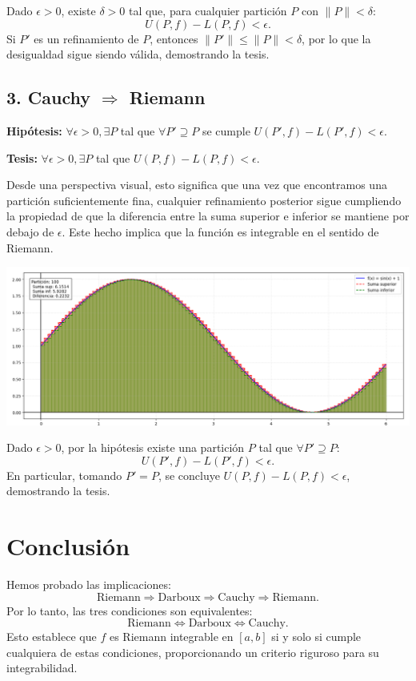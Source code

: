 \documentclass{article}
\begin{document}
Dado $\epsilon > 0$, existe $\delta > 0$ tal que, para cualquier partición $P$ con $\lVert P \rVert < \delta$:
\[
U(P, f) - L(P, f) < \epsilon.
\]
Si $P'$ es un refinamiento de $P$, entonces $\lVert P' \rVert \leq \lVert P \rVert < \delta$, por lo que la desigualdad sigue siendo válida, demostrando la tesis.

\subsection*{3. Cauchy $\Rightarrow$ Riemann}
\textbf{Hipótesis:} $\forall \epsilon > 0, \exists P$ tal que $\forall P' \supseteq P$ se cumple $U(P', f) - L(P', f) < \epsilon$.

\textbf{Tesis:} $\forall \epsilon > 0, \exists P$ tal que $U(P, f) - L(P, f) < \epsilon$.

Desde una perspectiva visual, esto significa que una vez que encontramos una partición suficientemente fina, cualquier refinamiento posterior sigue cumpliendo la propiedad de que la diferencia entre la suma superior e inferior se mantiene por debajo de $\epsilon$. Este hecho implica que la función es integrable en el sentido de Riemann.

\begin{center}
    \includegraphics[width=1\textwidth]{Figure_3.png}
\end{center}

Dado $\epsilon > 0$, por la hipótesis existe una partición $P$ tal que $\forall P' \supseteq P$:
\[
U(P', f) - L(P', f) < \epsilon.
\]
En particular, tomando $P' = P$, se concluye $U(P, f) - L(P, f) < \epsilon$, demostrando la tesis.

\section*{Conclusión}
Hemos probado las implicaciones:
\[
\text{Riemann} \Rightarrow \text{Darboux} \Rightarrow \text{Cauchy} \Rightarrow \text{Riemann}.
\]
Por lo tanto, las tres condiciones son equivalentes:
\[
\text{Riemann} \iff \text{Darboux} \iff \text{Cauchy}.
\]
Esto establece que $f$ es Riemann integrable en $[a, b]$ si y solo si cumple cualquiera de estas condiciones, proporcionando un criterio riguroso para su integrabilidad.
\end{document}
